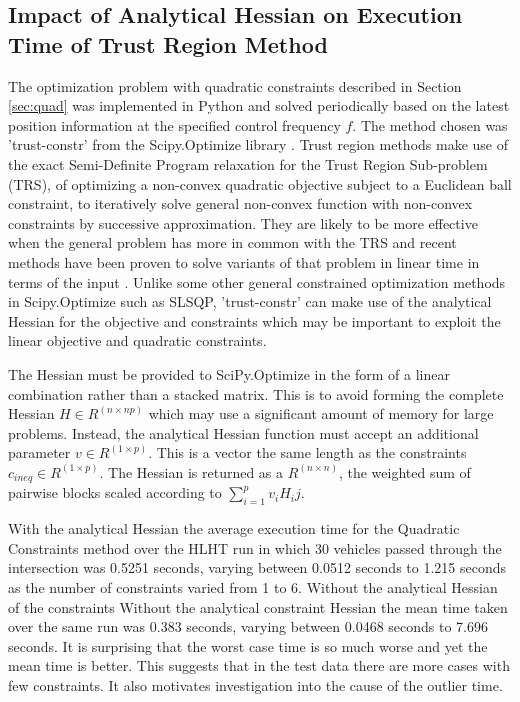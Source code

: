 \subsection{Impact of Analytical Hessian on Execution Time of Trust Region Method}
The optimization problem with quadratic constraints described in Section \ref{sec:quad} was implemented in Python and solved periodically based on the latest position information at the specified control frequency $f$. The method chosen was 'trust-constr' from the Scipy.Optimize library \cite{scipy}. Trust region methods make use of the exact Semi-Definite Program relaxation for the Trust Region Sub-problem (TRS), of optimizing a non-convex quadratic objective subject to a Euclidean ball constraint, to iteratively solve general non-convex function with non-convex constraints by successive approximation\cite{conn2000trust}. They are likely to be more effective when the general problem has more in common with the TRS and recent methods have been proven to solve variants of that problem in linear time in terms of the input \cite{Wang2019}. Unlike some other general constrained optimization methods in Scipy.Optimize such as SLSQP, 'trust-constr' can make use of the analytical Hessian for the objective and constraints which may be important to exploit the linear objective and quadratic constraints.   

The Hessian must be provided to SciPy.Optimize in the form of a linear combination rather than a stacked matrix. This is to avoid forming the complete Hessian $H \in R^{(n \times np)}$ which may use a significant amount of memory for large problems. Instead, the analytical Hessian function must accept an additional parameter $v \in R^{(1 \times p)}$. This is a vector the same length as the constraints $c_{ineq} \in R^{(1 \times p)}$. The Hessian is returned as a $R^{(n \times n)}$, the weighted sum of pairwise blocks scaled according to $\sum_{i=1}^p v_i H_ij$.
  
With the analytical Hessian the average execution time for the Quadratic Constraints method over the HLHT run in which 30 vehicles passed through the intersection was 0.5251 seconds, varying between 0.0512 seconds to 1.215 seconds as the number of constraints varied from 1 to 6. Without the analytical Hessian of the constraints
Without the analytical constraint  Hessian the mean time taken over the same run was 0.383 seconds, varying between 0.0468 seconds to 7.696 seconds. It is surprising that the worst case time is so much worse and yet the mean time is better. This suggests that in the test data there are more cases with few constraints. It also motivates investigation into the cause of the outlier time. 

